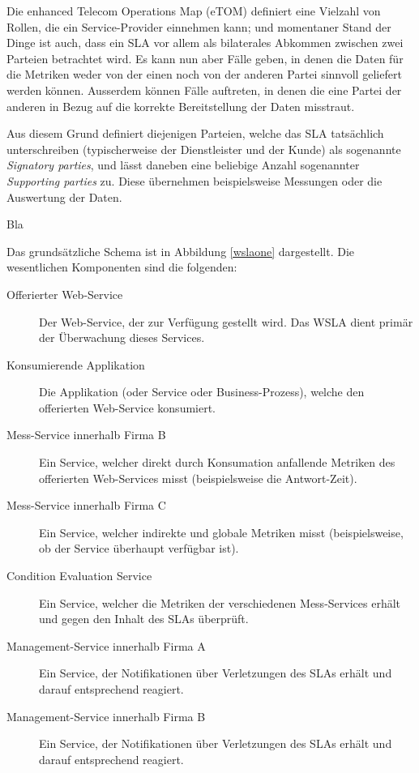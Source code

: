 \documentclass[11pt,listof=totoc]{scrreprt} %
\theoremstyle{definition}
\begin{document}
\begin{description}
\begin{itemize}
\end{itemize}
\item[Übertragung von Überwachungs-Verantwortlichkeiten an Drittparteien]
Die enhanced Telecom Operations Map (eTOM) \cite{ibm:wslaPaper, wiki:etom} definiert eine Vielzahl von Rollen, die ein Service-Provider einnehmen kann; und momentaner Stand der Dinge ist auch, dass ein SLA vor allem als bilaterales Abkommen zwischen zwei Parteien betrachtet wird. Es kann nun aber Fälle geben, in denen die Daten für die Metriken weder von der einen noch von der anderen Partei sinnvoll geliefert werden können. Ausserdem können Fälle auftreten, in denen die eine Partei der anderen in Bezug auf die korrekte Bereitstellung der Daten misstraut.

Aus diesem Grund definiert \cite{ibm:wslaPaper} diejenigen Parteien, welche das SLA tatsächlich unterschreiben (typischerweise der Dienstleister und der Kunde) als sogenannte {\em Signatory parties}, und lässt daneben eine beliebige Anzahl sogenannter {\em Supporting parties} zu. Diese übernehmen beispielsweise Messungen oder die Auswertung der Daten.
\item[{\em Need-to-know Principle} für das Deployment von SLAs]

\item Bla
\end{description}

Das grundsätzliche Schema ist in Abbildung \ref{wslaone} dargestellt. Die wesentlichen Komponenten sind die folgenden:

\begin{description}
\item[Offerierter Web-Service] Der Web-Service, der zur Verfügung gestellt wird. Das WSLA dient primär der Überwachung dieses Services.
\item[Konsumierende Applikation] Die Applikation (oder Service oder Business-Prozess), welche den offerierten Web-Service konsumiert.
\item[Mess-Service innerhalb Firma B] Ein Service, welcher direkt durch Konsumation anfallende Metriken des offerierten Web-Services misst (beispielsweise die Antwort-Zeit).
\item[Mess-Service innerhalb Firma C] Ein Service, welcher indirekte und globale Metriken misst (beispielsweise, ob der Service überhaupt verfügbar ist).
\item[Condition Evaluation Service] Ein Service, welcher die Metriken der verschiedenen Mess-Services erhält und gegen den Inhalt des SLAs überprüft.
\item[Management-Service innerhalb Firma A] Ein Service, der Notifikationen über Verletzungen des SLAs erhält und darauf entsprechend reagiert.
\item[Management-Service innerhalb Firma B] Ein Service, der Notifikationen über Verletzungen des SLAs erhält und darauf entsprechend reagiert.
\end{description}
\end{document}
